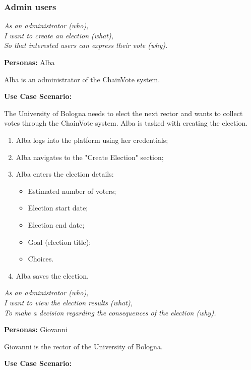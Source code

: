 \documentclass{scrartcl}
\begin{document}
\subsubsection*{Admin users}

\noindent
\emph{%
    As an administrator (who), \\ 
    I want to create an election (what), \\ 
    So that interested users can express their vote (why).
}
\vspace*{0.2cm}

\textbf{Personas:} Alba

Alba is an administrator of the ChainVote system.

\textbf{Use Case Scenario:}

The University of Bologna needs to elect the next rector and wants to collect votes through the ChainVote system. Alba is tasked with creating the election.

\begin{enumerate}
    \item Alba logs into the platform using her credentials;
    \item Alba navigates to the "Create Election" section;
    \item Alba enters the election details:
    \begin{itemize}
        \item Estimated number of voters;
        \item Election start date;
        \item Election end date;
        \item Goal (election title);
        \item Choices.
    \end{itemize}
    \item Alba saves the election.
\end{enumerate}

\vspace*{0.5cm}
\noindent
\emph{%
    As an administrator (who), \\
    I want to view the election results (what), \\
    To make a decision regarding the consequences of the election (why).
}
\vspace*{0.2cm}

\textbf{Personas:} Giovanni

Giovanni is the rector of the University of Bologna.

\textbf{Use Case Scenario:}
\end{document}
